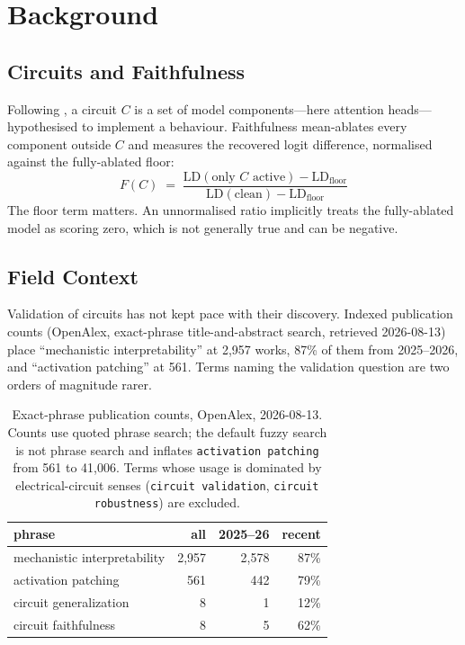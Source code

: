 \documentclass[11pt,a4paper]{article}
\begin{document}
\section{Background}
\label{sec:background}

\subsection{Circuits and Faithfulness}

Following \citet{wang2022ioi}, a circuit $C$ is a set of model components---here
attention heads---hypothesised to implement a behaviour. Faithfulness mean-ablates
every component outside $C$ and measures the recovered logit difference, normalised
against the fully-ablated floor:
\[
  F(C) \;=\; \frac{\mathrm{LD}(\text{only } C \text{ active}) - \mathrm{LD}_{\text{floor}}}
                  {\mathrm{LD}(\text{clean}) - \mathrm{LD}_{\text{floor}}}
\]
The floor term matters. An unnormalised ratio implicitly treats the fully-ablated
model as scoring zero, which is not generally true and can be negative.

\subsection{Field Context}
\label{sec:landscape}

Validation of circuits has not kept pace with their discovery. Indexed publication
counts (OpenAlex, exact-phrase title-and-abstract search, retrieved 2026-08-13) place
``mechanistic interpretability'' at 2{,}957 works, 87\% of them from 2025--2026, and
``activation patching'' at 561. Terms naming the validation question are two orders of
magnitude rarer.

\begin{table}[H]
  \centering
  \caption{Exact-phrase publication counts, OpenAlex, 2026-08-13. Counts use quoted
    phrase search; the default fuzzy search is not phrase search and inflates
    \texttt{activation patching} from 561 to 41{,}006. Terms whose usage is dominated
    by electrical-circuit senses (\texttt{circuit validation}, \texttt{circuit
    robustness}) are excluded.}
  \label{tab:landscape}
  \smallskip
  \begin{tabular}{lrrr}
    \toprule
    phrase & all & 2025--26 & recent \\
    \midrule
    mechanistic interpretability  & 2{,}957 & 2{,}578 & 87\% \\
    activation patching           &     561 &     442 & 79\% \\
    circuit generalization        &       8 &       1 & 12\% \\
    circuit faithfulness          &       8 &       5 & 62\% \\
    \bottomrule
  \end{tabular}
\end{table}
\end{document}

